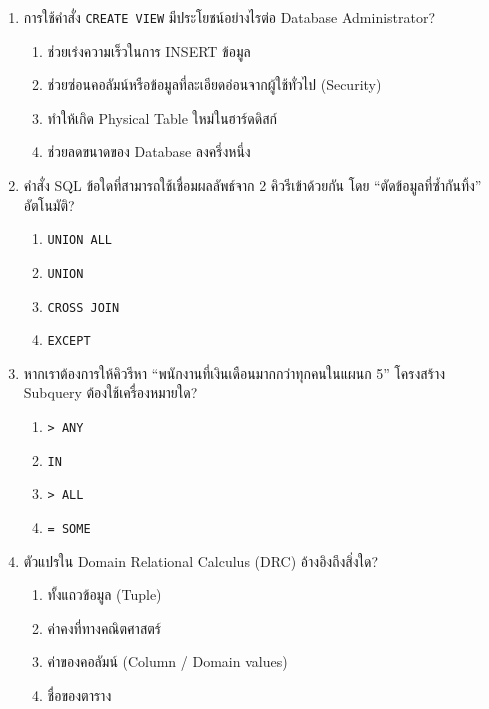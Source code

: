 \documentclass[a4paper,12pt]{article}
\begin{document}
\begin{enumerate}[label=\textbf{\arabic*.}]
    \item การใช้คำสั่ง \texttt{CREATE VIEW} มีประโยชน์อย่างไรต่อ Database Administrator?
    \begin{enumerate}[label=\alph*.]
        \item ช่วยเร่งความเร็วในการ INSERT ข้อมูล
        \item ช่วยซ่อนคอลัมน์หรือข้อมูลที่ละเอียดอ่อนจากผู้ใช้ทั่วไป (Security)
        \item ทำให้เกิด Physical Table ใหม่ในฮาร์ดดิสก์
        \item ช่วยลดขนาดของ Database ลงครึ่งหนึ่ง
    \end{enumerate}

    \item คำสั่ง SQL ข้อใดที่สามารถใช้เชื่อมผลลัพธ์จาก 2 คิวรีเข้าด้วยกัน โดย ``ตัดข้อมูลที่ซ้ำกันทิ้ง'' อัตโนมัติ?
    \begin{enumerate}[label=\alph*.]
        \item \texttt{UNION ALL}
        \item \texttt{UNION}
        \item \texttt{CROSS JOIN}
        \item \texttt{EXCEPT}
    \end{enumerate}

    \item หากเราต้องการให้คิวรีหา ``พนักงานที่เงินเดือนมากกว่าทุกคนในแผนก 5'' โครงสร้าง Subquery ต้องใช้เครื่องหมายใด?
    \begin{enumerate}[label=\alph*.]
        \item \texttt{> ANY}
        \item \texttt{IN}
        \item \texttt{> ALL}
        \item \texttt{= SOME}
    \end{enumerate}

    \item ตัวแปรใน Domain Relational Calculus (DRC) อ้างอิงถึงสิ่งใด?
    \begin{enumerate}[label=\alph*.]
        \item ทั้งแถวข้อมูล (Tuple)
        \item ค่าคงที่ทางคณิตศาสตร์
        \item ค่าของคอลัมน์ (Column / Domain values)
        \item ชื่อของตาราง
    \end{enumerate}

\end{enumerate}
\end{document}
